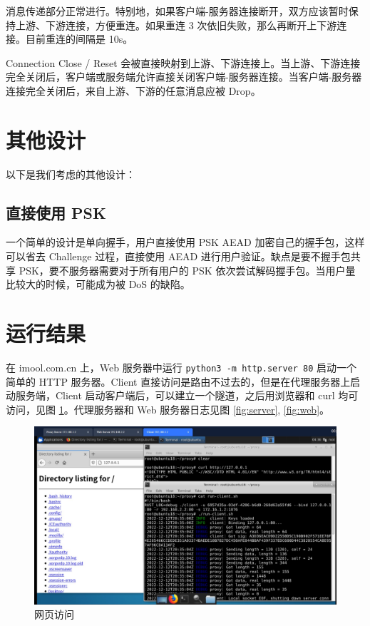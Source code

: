 \documentclass{ctexart}
\begin{document}
  消息传递部分正常进行。特别地，如果客户端-服务器连接断开，双方应该暂时保持上游、下游连接，方便重连。如果重连 3 次依旧失败，那么再断开上下游连接。目前重连的间隔是 10s。

  Connection Close / Reset 会被直接映射到上游、下游连接上。当上游、下游连接完全关闭后，客户端或服务端允许直接关闭客户端-服务器连接。当客户端-服务器连接完全关闭后，来自上游、下游的任意消息应被 Drop。

  \section{其他设计}
  以下是我们考虑的其他设计：

  \subsection{直接使用 PSK}

  一个简单的设计是单向握手，用户直接使用 PSK AEAD 加密自己的握手包，这样可以省去 Challenge 过程，直接使用 AEAD 进行用户验证。缺点是要不握手包共享 PSK，要不服务器需要对于所有用户的 PSK 依次尝试解码握手包。当用户量比较大的时候，可能成为被 DoS 的缺陷。

  \section{运行结果}
  在 imool.com.cn 上，Web 服务器中运行 \texttt{python3 -m http.server 80} 启动一个简单的 HTTP 服务器。Client 直接访问是路由不过去的，但是在代理服务器上启动服务端，Client 启动客户端后，可以建立一个隧道，之后用浏览器和 curl 均可访问，见图 \ref{fig:client}。代理服务器和 Web 服务器日志见图 \ref{fig:server}, \ref{fig:web}。

  \begin{figure}
    \includegraphics[width=\textwidth]{client.jpg}
    \caption{网页访问}
    \label{fig:client}
  \end{figure}
\end{document}
